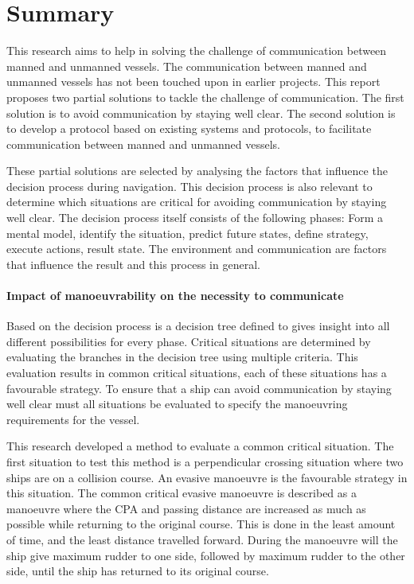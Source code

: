 \chapter{Summary}
This research aims to help in solving the challenge of communication between manned and unmanned vessels. The communication between manned and unmanned vessels has not been touched upon in earlier projects. This report proposes two partial solutions to tackle the challenge of communication. The first solution is to avoid communication by staying well clear. The second solution is to develop a protocol based on existing systems and protocols, to facilitate communication between manned and unmanned vessels.

These partial solutions are selected by analysing the factors that influence the decision process during navigation. This decision process is also relevant to determine which situations are critical for avoiding communication by staying well clear. The decision process itself consists of the following phases: Form a mental model, identify the situation, predict future states, define strategy, execute actions, result state. The environment and communication are factors that influence the result and this process in general.

\subsubsection{Impact of manoeuvrability on the necessity to communicate}
Based on the decision process is a decision tree defined to gives insight into all different possibilities for every phase. Critical situations are determined by evaluating the branches in the decision tree using multiple criteria. This evaluation results in common critical situations, each of these situations has a favourable strategy. To ensure that a ship can avoid communication by staying well clear must all situations be evaluated to specify the manoeuvring requirements for the vessel.

This research developed a method to evaluate a common critical situation. The first situation to test this method is a perpendicular crossing situation where two ships are on a collision course. An evasive manoeuvre is the favourable strategy in this situation. The common critical evasive manoeuvre is described as a manoeuvre where the \acf{CPA} and passing distance are increased as much as possible while returning to the original course. This is done in the least amount of time, and the least distance travelled forward. During the manoeuvre will the ship give maximum rudder to one side, followed by maximum rudder to the other side, until the ship has returned to its original course.

